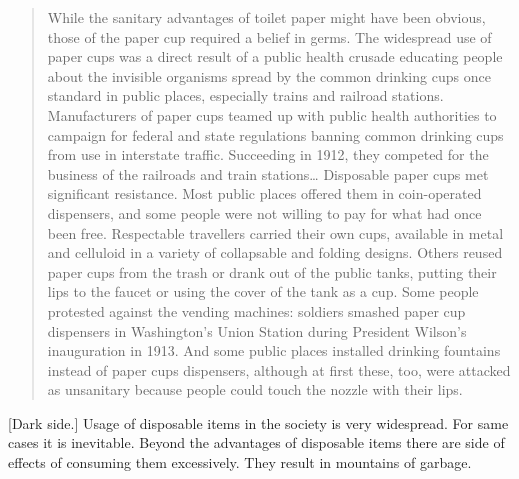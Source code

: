
\begin{quote}
While the sanitary advantages of toilet paper might have been obvious, those of the paper cup required a belief in germs. The widespread use of paper cups was a direct result of a public health crusade educating people about the invisible organisms spread by the common drinking cups once standard in public places, especially trains and railroad stations. Manufacturers of paper cups teamed up with public health authorities to campaign for federal and state regulations banning common drinking cups from use in interstate traffic. Succeeding in 1912, they competed for the business of the railroads and train stations\ldots
Disposable paper cups met significant resistance. Most public places offered them in coin-operated dispensers, and some people were not willing to pay for what had once been free. Respectable travellers carried their own cups, available in metal and celluloid in a variety of collapsable and folding designs. Others reused paper cups from the trash or drank out of the public tanks, putting their lips to the faucet or using the cover of the tank as a cup. Some people protested against the vending machines: soldiers smashed paper cup dispensers in Washington’s Union Station during President Wilson’s inauguration in 1913. And some public places installed drinking fountains instead of paper cups dispensers, although at first these, too, were attacked as unsanitary because people could touch the nozzle with their lips.
\end{quote}

[Dark side.] Usage of disposable items in the society is very widespread. For same cases it is inevitable. Beyond the advantages of disposable items there are side of effects of consuming them excessively. They result in mountains of garbage.

 

